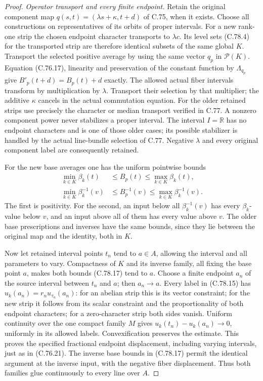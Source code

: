 \begin{proof}
\emph{Operator transport and every finite endpoint.}
Retain the original component map
$q(s,t)=(\lambda s+\kappa,t+d)$ of C.75,
when it exists. Choose all constructions on
representatives of its orbits of proper intervals.
For a new rank-one strip the chosen endpoint
character transports to $\lambda c$. Its
level sets (C.78.4) for the transported strip
are therefore identical subsets of the same
global $K$. Transport the selected positive
average by using the same vector $q_p$ in
$\mathcal P(K)$. Equation (C.76.17), linearity
and preservation of the constant function by
$\Lambda_{q_p}$ give
$B'_p(t+d)=B_p(t)+d$ exactly.
The allowed actual fiber intervals transform
by multiplication by $\lambda$.
Transport their selection by that multiplier;
the additive $\kappa$ cancels in the actual
commutation equation. For the older retained
strips use precisely the character or median
transport verified in C.77. A nonzero component
power never stabilizes a proper interval.
The interval $I=\mathbb R$ has no endpoint
characters and is one of those older cases;
its possible stabilizer is handled by the
actual line-bundle selection of C.77. Negative
$\lambda$ and every original component label
are consequently retained.

For the new base averages one has the uniform
pointwise bounds
\[
 \begin{split}
 \min_{k\in K}\beta_k(t)&\leq B_p(t)\leq
                          \max_{k\in K}\beta_k(t),\\
 \min_{k\in K}\beta_k^{-1}(v)&\leq B_p^{-1}(v)\leq
                          \max_{k\in K}\beta_k^{-1}(v).
 \end{split}                                                   \tag{C.78.17}
\]
The first is positivity. For the second, an
input below all $\beta_k^{-1}(v)$ has every
$\beta_k$-value below $v$, and an input above
all of them has every value above $v$.
The older base prescriptions and inverses
have the same bounds, since they lie between
the original map and the identity, both in $K$.

Now let retained interval points $t_n$ tend
to $a\in A$, allowing the interval and all
parameters to vary. Compactness of $K$ and
its inverse family, all fixing the base point
$a$, makes both bounds (C.78.17) tend to $a$.
Choose a finite endpoint $a_n$ of the source
interval between $t_n$ and $a$; then $a_n\to a$.
Every label in (C.78.15) has
$u_k(a_n)=r_nu_{\tau_n}(a_n)$: for an abelian
strip this is its vector constraint; for the
new strip it follows from its scalar constraint
and the proportionality of both endpoint
characters; for a zero-character strip both
sides vanish. Uniform continuity over the
one compact family $M$ gives
$u_k(t_n)-u_k(a_n)\to0$, uniformly in its
allowed labels. Convexification preserves
the estimate. This proves the specified
fractional endpoint displacement, including
varying intervals, just as in (C.76.21).
The inverse base bounds in (C.78.17) permit
the identical argument at the inverse input,
with the negative fiber displacement. Thus
both families glue continuously to every
line over $A$.


\end{proof}
